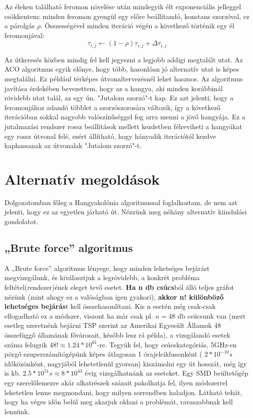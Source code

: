 Az éleken található feromon növelése után mindegyik élt exponenciális jelleggel csökkentem: minden feromon gyengül egy előre beállítandó, konstans szorzóval, ez a párolgás \(\rho\). Összességével minden iteráció végén a következő történik egy él feromonjával:
\[ \tau_{i,j} \leftarrow (1-\rho)\tau_{i,j} + \Delta\tau_{i,j} \]

Az útkeresés közben mindig fel kell jegyezni a legjobb addigi megtalált utat. Az ACO algoritmus egyik előnye, hogy több, hasonlóan jó alternatív utat is képes megtalálni. Ez például térképes útvonaltervezésnél lehet hasznos. Az algoritmus javítása érdekében bevezettem, hogy az a hangya, aki minden korábbinál rövidebb utat talál, az egy ún. "Jutalom szorzó"-t kap. Ez azt jelenti, hogy a feromonjához adandó többlet a szorzószorosára változik, így a következő iterációban sokkal nagyobb valószínűséggel fog arra menni a jövő hangyája. Ez a jutalmazási rendszer rossz beállítások mellett kezdetben félreviheti a hangyákat egy rossz útvonal felé, ezért állítható, hogy hányadik iterációtól kezdve kaphassanak az útvonalak "Jutalom szorzó"-t.

\section{Alternatív megoldások}

Dolgozatomban főleg a Hangyakolónia algoritmussal foglalkoztam, de nem azt jelenti, hogy ez az egyetlen járható út. Nézzünk meg néhány alternatív kiindulási gondolatot.

\subsection{„Brute force” algoritmus}
A „Brute force” algoritmus lényege, hogy minden lehetséges bejárást megvizsgálunk, és kiválasztjuk a legrövidebb, a konkrét probléma feltétel(rendszer)ének eleget tevő esetet. \textbf{Ha n db csúcs}ból álló teljes gráfot nézünk (mint ahogy ez a valóságban igen gyakori), \textbf{akkor n! különböző lehetséges bejárás}t kell összehasonlítani. Kis n esetén még csak-csak elfogadható ez a módszer, viszont ha már csak pl. \(n=48\) db csúcsunk van (mert esetleg szeretnénk bejárni TSP szerint az Amerikai Egyesült Államok 48 összefüggő államának fővárosait, később lesz rá példa), a vizsgálandó esetek száma felugrik \( 48! \approx 1.24 * 10^{61} \)-re. Tegyük fel, hogy csúcskategóriás, 5GHz-en pörgő szuperszámítógépünk képes átlagosan 1 órajelciklusonként (  \(2*10^{-10}s\) időközönként, nagyjából lehetetlenül gyorsan) kiszámolni egy út hosszát, még így is kb. \(2.5 * 10^{51}s \approx 8 * 10^{43} \) évig vizsgálhatnánk az eseteket. Egy SMD beültetőgép egy szerelőlemezre akár alkatrészek százait pakolhatja fel, ilyen módszerrel lehetetlen lenne megmondani, hogy milyen sorrendben haladjon. Látható tehát, hogy ha véges időn belül meg akarjuk oldani a problémát, ravaszabbnak kell lennünk.

